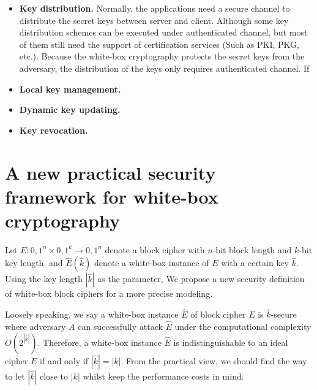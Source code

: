 \documentclass{SCIS2018}
\begin{document}
{\begin{itemize}
\item \textbf{Key distribution.} Normally, the applications need a secure channel to distribute the secret keys between server and client. Although some key distribution schemes can be executed under authenticated channel, but most of them still need the support of certification services (Such as PKI, PKG, etc.). Because the white-box cryptography protects the secret keys from the adversary, the distribution of the keys only requires authenticated channel. If

\item \textbf{Local key management.}

\item \textbf{Dynamic key updating.}

\item \textbf{Key revocation.}
\end{itemize}

\section{A new practical security framework for white-box cryptography}

Let $E:{0,1}^{n}\times{0,1}^{k}\rightarrow{0,1}^{n}$ denote a block cipher with $n$-bit block length and $k$-bit key length. and $\hat{E}(\hat{k})$ denote a white-box instance of $E$ with a certain key $\hat{k}$. Using the key length $|\hat{k}|$ as the parameter, We propose a new security definition of white-box block ciphers for a more precise modeling.


Loosely speaking, we say a white-box instance $\hat{E}$ of block cipher $E$ is $\hat{k}$-secure where adversary $A$ can successfully attack $\hat{E}$ under the computational complexity $O(2^{|\hat{k}|})$. Therefore, a white-box instance $\hat{E}$ is indistinguishable to an ideal cipher $E$ if and only if $|\hat{k}| = |k|$. From the practical view, we should find the way to let $|\hat{k}|$ close to $|k|$ whilst keep the performance costs in mind.



}
\end{document}
